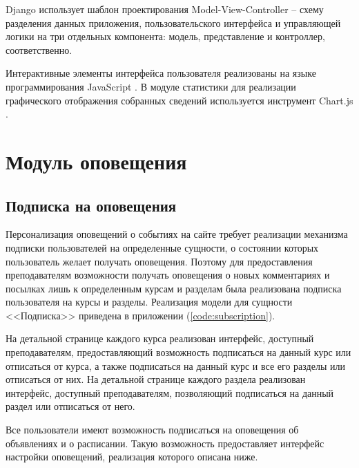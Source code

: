 \documentclass[14pt, a4paper, oneside]{extarticle}
\begin{document}
Django использует шаблон проектирования Model-View-Controller – схему разделения данных приложения, пользовательского интерфейса и управляющей логики на три отдельных компонента: модель, представление и контроллер, соответственно.

Интерактивные элементы интерфейса пользователя реализованы на языке программирования JavaScript \cite{js}. В модуле статистики для реализации графического отображения собранных сведений используется инструмент Chart.js \cite{chartjs}.
\newpage

\section{Модуль оповещения}
\subsection{Подписка на оповещения}
Персонализация оповещений о событиях на сайте требует реализации механизма подписки пользователей на определенные сущности, о состоянии которых пользователь желает получать оповещения. Поэтому для предоставления преподавателям возможности получать оповещения о новых комментариях и посылках лишь к определенным курсам и разделам была реализована подписка пользователя на курсы и разделы. Реализация модели для сущности <<Подписка>> приведена в приложении (\ref{code:subscription}).

На детальной странице каждого курса реализован интерфейс, доступный преподавателям, предоставляющий возможность подписаться на данный курс или отписаться от курса, а также подписаться на данный курс и все его разделы или отписаться от них. На детальной странице каждого раздела реализован интерфейс, доступный преподавателям, позволяющий подписаться на данный раздел или отписаться от него.

Все пользователи имеют возможность подписаться на оповещения об объявлениях и о расписании. Такую возможность предоставляет интерфейс настройки оповещений, реализация которого описана ниже.
\end{document}
